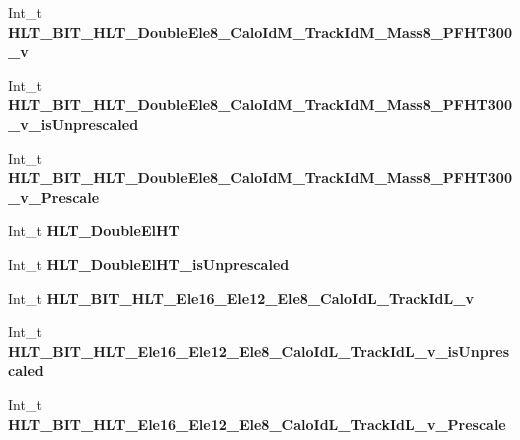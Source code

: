 \begin{DoxyCompactItemize}
\item 
\hypertarget{classMiniTree_a2781b514798e5688081a33e6213f6388}{}\label{classMiniTree_a2781b514798e5688081a33e6213f6388} 
Int\+\_\+t {\bfseries H\+L\+T\+\_\+\+B\+I\+T\+\_\+\+H\+L\+T\+\_\+\+Double\+Ele8\+\_\+\+Calo\+Id\+M\+\_\+\+Track\+Id\+M\+\_\+\+Mass8\+\_\+\+P\+F\+H\+T300\+\_\+v}
\item 
\hypertarget{classMiniTree_ab7913429189a11058284235cc55c3f88}{}\label{classMiniTree_ab7913429189a11058284235cc55c3f88} 
Int\+\_\+t {\bfseries H\+L\+T\+\_\+\+B\+I\+T\+\_\+\+H\+L\+T\+\_\+\+Double\+Ele8\+\_\+\+Calo\+Id\+M\+\_\+\+Track\+Id\+M\+\_\+\+Mass8\+\_\+\+P\+F\+H\+T300\+\_\+v\+\_\+is\+Unprescaled}
\item 
\hypertarget{classMiniTree_a82300427dd7539a0c972369bf9bd19e9}{}\label{classMiniTree_a82300427dd7539a0c972369bf9bd19e9} 
Int\+\_\+t {\bfseries H\+L\+T\+\_\+\+B\+I\+T\+\_\+\+H\+L\+T\+\_\+\+Double\+Ele8\+\_\+\+Calo\+Id\+M\+\_\+\+Track\+Id\+M\+\_\+\+Mass8\+\_\+\+P\+F\+H\+T300\+\_\+v\+\_\+\+Prescale}
\item 
\hypertarget{classMiniTree_a3376e0df361b2ee2037d585f7c983cfa}{}\label{classMiniTree_a3376e0df361b2ee2037d585f7c983cfa} 
Int\+\_\+t {\bfseries H\+L\+T\+\_\+\+Double\+El\+HT}
\item 
\hypertarget{classMiniTree_a4317d2c7bd04dbc9fef39816bfea108e}{}\label{classMiniTree_a4317d2c7bd04dbc9fef39816bfea108e} 
Int\+\_\+t {\bfseries H\+L\+T\+\_\+\+Double\+El\+H\+T\+\_\+is\+Unprescaled}
\item 
\hypertarget{classMiniTree_aa18a6474f9f3350d7c3807415e5224cc}{}\label{classMiniTree_aa18a6474f9f3350d7c3807415e5224cc} 
Int\+\_\+t {\bfseries H\+L\+T\+\_\+\+B\+I\+T\+\_\+\+H\+L\+T\+\_\+\+Ele16\+\_\+\+Ele12\+\_\+\+Ele8\+\_\+\+Calo\+Id\+L\+\_\+\+Track\+Id\+L\+\_\+v}
\item 
\hypertarget{classMiniTree_a48911b7e23d78ae4c16c73c95d376938}{}\label{classMiniTree_a48911b7e23d78ae4c16c73c95d376938} 
Int\+\_\+t {\bfseries H\+L\+T\+\_\+\+B\+I\+T\+\_\+\+H\+L\+T\+\_\+\+Ele16\+\_\+\+Ele12\+\_\+\+Ele8\+\_\+\+Calo\+Id\+L\+\_\+\+Track\+Id\+L\+\_\+v\+\_\+is\+Unprescaled}
\item 
\hypertarget{classMiniTree_a2b74cadcda2627182f7a6ddcab0d0dba}{}\label{classMiniTree_a2b74cadcda2627182f7a6ddcab0d0dba} 
Int\+\_\+t {\bfseries H\+L\+T\+\_\+\+B\+I\+T\+\_\+\+H\+L\+T\+\_\+\+Ele16\+\_\+\+Ele12\+\_\+\+Ele8\+\_\+\+Calo\+Id\+L\+\_\+\+Track\+Id\+L\+\_\+v\+\_\+\+Prescale}
\item 
\hypertarget{classMiniTree_a7e66bb6d0d6e3fb0c240a9b8fc001643}{}\label{classMiniTree_a7e66bb6d0d6e3fb0c240a9b8fc001643} 

\end{DoxyCompactItemize}
